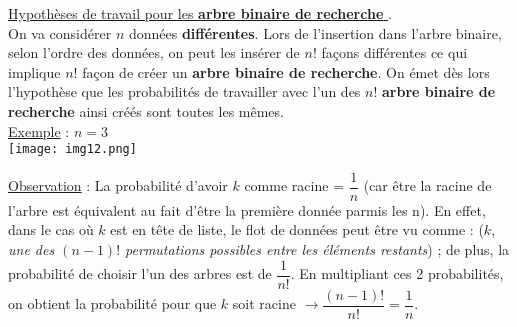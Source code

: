 \documentclass{article}
\newcommand{\abr}{\textbf{arbre binaire de recherche }}
\newcommand{\abrb}{\textbf{arbre binaire de recherche}}
\begin{document}
\underline{Hypothèses de travail pour les \abr}. \\

On va considérer $n$ données \textbf{différentes}. Lors de l'insertion dans l'arbre binaire, selon l'ordre des données, on
peut les insérer de $n!$ façons différentes ce qui implique $n!$ façon de créer un \abrb. On émet dès lors l'hypothèse que
les probabilités de travailler avec l'un des $n!$ \abr ainsi créés sont toutes les mêmes. \\

\noindent\underline{Exemple} : $n=3$\\ 

\texttt{[image: img12.png]}

\underline{Observation} : La probabilité d'avoir $k$ comme racine = $\dfrac{1}{n}$ (car être la racine de l'arbre est 
équivalent au fait d'être la première donnée parmis les n). En effet, dans le cas où $k$ est en tête de liste, le flot de
données peut être vu comme : ($k$, \textit{une des $(n-1)!$ permutations possibles entre les éléments restants}) ; de plus,
la probabilité de choisir l'un des arbres est de $\dfrac{1}{n!}$. En multipliant ces 2 probabilités, on obtient la 
probabilité pour que $k$ soit racine $\rightarrow \dfrac{(n-1)!}{n!} = \dfrac{1}{n} $.
\end{document}
